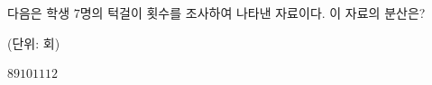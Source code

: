 다음은 학생 $7$명의 턱걸이 횟수를 조사하여 나타낸 자료이다. 이 자료의 분산은?\par{\raggedleft\small (단위: 회)\par}
\begin{choices32}{$8$}{$9$}{$10$}{$11$}{$12$}\end{choices32}
